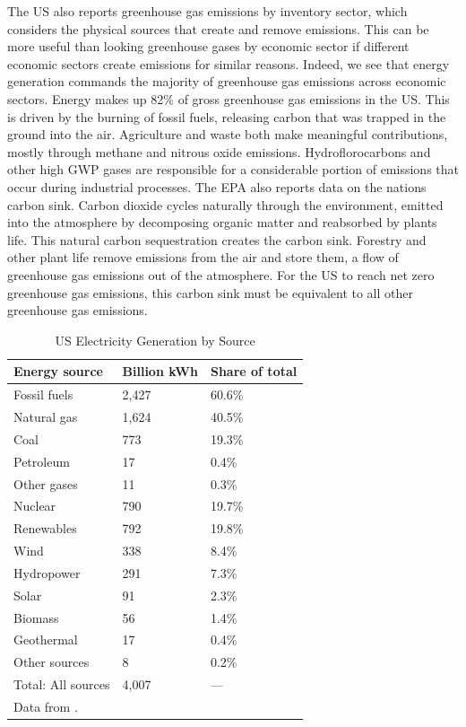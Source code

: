 The US also reports greenhouse gas emissions by inventory sector, which considers the physical sources that create and remove emissions. This can be more useful than looking greenhouse gases by economic sector if different economic sectors create emissions for similar reasons. Indeed, we see that energy generation commands the majority of greenhouse gas emissions across economic sectors. Energy makes up 82\% of gross greenhouse gas emissions in the US. This is driven by the burning of fossil fuels, releasing carbon that was trapped in the ground into the air. Agriculture and waste both make meaningful contributions, mostly through methane and nitrous oxide emissions. Hydroflorocarbons and other high GWP gases are responsible for a considerable portion of emissions that occur during industrial processes. The EPA also reports data on the nations carbon sink. Carbon dioxide cycles naturally through the environment, emitted into the atmosphere by decomposing organic matter and reabsorbed by plants life. This natural carbon sequestration creates the carbon sink. Forestry and other plant life remove emissions from the air and store them, a flow of greenhouse gas emissions out of the atmosphere. For the US to reach net zero greenhouse gas emissions, this carbon sink must be equivalent to all other greenhouse gas emissions. 

\begin{table}
\caption{US Electricity Generation by Source \label{ele_gen_source}}
\centering
\begin{tabular}{l C{3cm} C{3cm}}
\hline \hline
Energy source & Billion kWh &	Share of total \\ 
\hline 
Fossil fuels & 2,427 & 60.6\% \\
\qquad Natural gas &	1,624	& 40.5\% \\
\qquad Coal & 773 & 19.3\%\\
\qquad Petroleum	& 17 & 0.4\% \\
\qquad Other gases & 11& 0.3\% \\
Nuclear & 790	& 19.7\% \\
Renewables & 792 & 19.8\% \\
\qquad Wind & 338 & 8.4\%\\
\qquad Hydropower	& 291 &	7.3\% \\
\qquad Solar & 91 & 2.3\% \\
\qquad Biomass	& 56 & 1.4\% \\
\qquad Geothermal & 17 & 0.4\% \\
Other sources & 8 & 0.2\% \\
Total: All sources	& 4,007  & ---\\
\hline \hline
\footnotesize \raggedright Data from \cite{eia_report1}.
\end{tabular}
\end{table}

